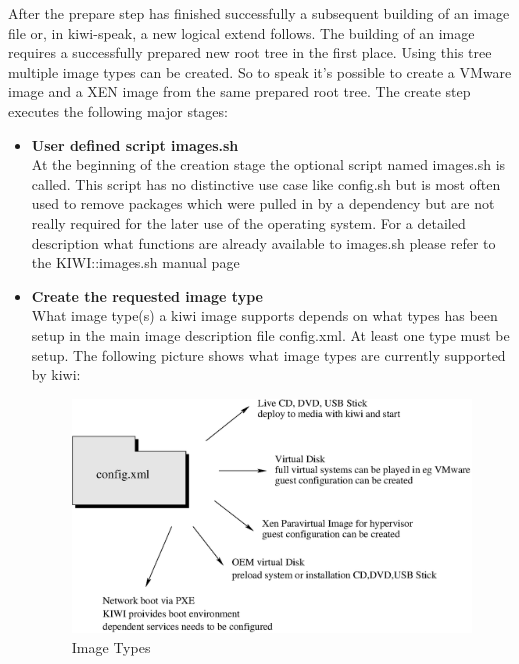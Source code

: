 After the prepare step has finished successfully a subsequent building of
an image file or, in kiwi-speak, a new logical extend follows.
The building of an image requires a successfully prepared new root
tree in the first place. Using this tree multiple image types can be
created. So to speak it's possible to create a VMware image and a
XEN image from the same prepared root tree. The create step executes the
following major stages:

\begin{itemize}
\item \textbf{User defined script images.sh}\\
      At the beginning of the creation stage the optional script named
      images.sh is called. This script has no distinctive use case like
      config.sh but is most often used to remove packages which were pulled
      in by a dependency but are not really required for the later use
      of the operating system. For a detailed description what
      functions are already available to images.sh please refer to
      the KIWI::images.sh manual page
\item \textbf{Create the requested image type}\\
      What image type(s) a kiwi image supports depends on what types has been
      setup in the main image description file config.xml. At least one type
      must be setup. The following picture shows what image types are
      currently supported by kiwi:

      \begin{figure}[h]
      \centering
      \includegraphics[scale=0.5]{pictures/types.eps}
      \caption{Image Types}
      \label{fig:types}
      \end{figure}
\end{itemize}

